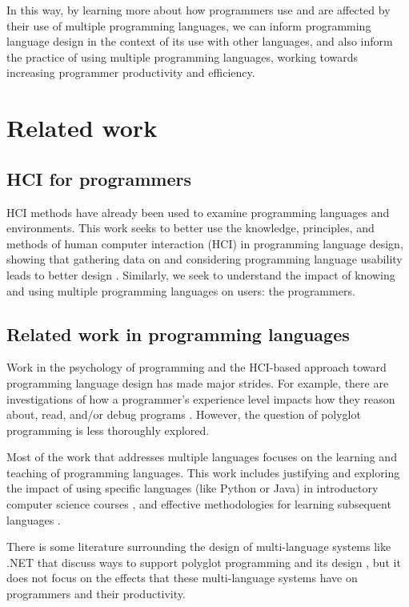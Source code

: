 \documentclass[a4paper,UKenglish,cleveref, autoref]{oasics-v2019}
\begin{document}
In this way, by learning more about how programmers use and are affected by their use of multiple programming languages, we can inform programming language design in the context of its use with other languages, and also inform the practice of using multiple programming languages, working towards increasing programmer productivity and efficiency. 

\section{Related work}

\subsection{HCI for programmers}
HCI methods have already been used to examine programming languages and environments. This work seeks to better use the knowledge, principles, and methods of human computer interaction (HCI) in programming language design, showing that gathering data on and considering programming language usability leads to better design \cite{pl0017, pl0027}. Similarly, we seek to understand the impact of knowing and using multiple programming languages on users: the programmers. 

\subsection{Related work in programming languages}
Work in the psychology of programming and the HCI-based approach toward programming language design has made major strides. For example, there are investigations of how a programmer’s experience level impacts how they reason about, read, and/or debug programs \cite{pl0019, pl0021, pl0020}. However, the question of polyglot programming is less thoroughly explored. 

Most of the work that addresses multiple languages focuses on the learning and teaching of programming languages. This work includes justifying and exploring the impact of using specific languages (like Python or Java) in introductory computer science courses \cite{pl0024, pl0023}, and effective methodologies for learning subsequent languages \cite{pl0018, pl0022}.  

There is some literature surrounding the design of multi-language systems like .NET that discuss ways to support polyglot programming and its design \cite{pl0038}, but it does not focus on the effects that these multi-language systems have on programmers and their productivity. 
\end{document}
